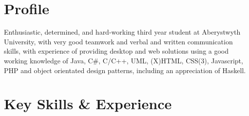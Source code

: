 \documentclass[a4paper, 10pt]{extarticle} %
\begin{document}
%
%
%

 
\section{Profile}

{\small Enthusiastic, determined, and hard-working third year student at Aberystwyth University, with very good teamwork and verbal and written communication skills, with experience of providing desktop and web solutions using a good working knowledge of Java, C\#, C/C++, UML, (X)HTML, CSS(3), Javascript, PHP and object orientated design patterns, including an appreciation of Haskell.}


\section{Key Skills \& Experience}
\end{document}
